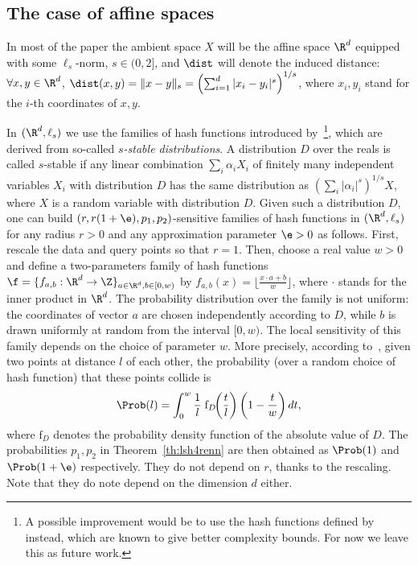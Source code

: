 \subsection{The case of affine spaces}
\label{sec:pleb_affine}

In most of the paper the ambient space $X$ will be the affine
space $\R^d$ equipped with some $\ell_s$-norm, $s\in
(0,2]$, and $\dist$ will denote the induced distance: $\forall x,y\in
\R^d$, $\dist(x,y) = \|x-y\|_s = \left(\sum_{i=1}^d
|x_i-y_i|^s\right)^{1/s}$, where $x_i,y_i$ stand for the $i$-th
coordinates of $x,y$.

In $(\R^d, \ell_s)$ we use the families of hash functions introduced
by~\citet{DIIM04}\footnote{A possible improvement would be to use the
  hash functions defined by~\citet{AI06} instead, which are known to
  give better complexity bounds. For now we leave this as future
  work.}, which are derived from so-called {\em $s$-stable
  distributions}. A distribution $D$ over the reals is called
$s$-stable if any linear combination $\sum_{i} \alpha_i X_i$ of
finitely many independent variables $X_i$ with distribution $D$ has
the same distribution as $(\sum_i |\alpha_i|^s)^{1/s} X$, where $X$ is
a random variable with distribution $D$.  Given such a distribution
$D$, one can build $(r, r(1+\e), p_1, p_2)$-sensitive families of hash
functions in $(\R^d, \ell_s)$ for any radius $r> 0$ and any
approximation parameter $\e>0$ as follows. First, rescale the data and
query points so that $r=1$. Then, choose a real value $w>0$ and define
a two-parameters family of hash functions
$\f=\{f_{a,b}:\R^d\to\Z\}_{a\in\R^d, b\in [0,w)}$ by
  $f_{a,b}(x)=\lfloor \frac{x\cdot a + b}{w}\rfloor$, where $\cdot$
  stands for the inner product in $\R^d$. The probability distribution
  over the family is not uniform: the coordinates of vector
  $a$ are chosen independently according to $D$, while $b$ is drawn
  uniformly at random from the interval $[0,w)$.  The local
    sensitivity of this family depends on the choice of parameter
    $w$. More precisely, according to~\citet{DIIM04}, given two points
    at distance $l$ of each other, the probability (over a random
    choice of hash function) that these points collide is
\begin{equation}\label{eq:proba_collision_ls}
\Prob(l)=\int_0^w \frac{1}{l}\; \mathrm{f}_D\!\! \left(\frac{t}{l}\right)
    \left(1-\frac{t}{w}\right)dt,
\end{equation}
 where $\mathrm{f}_D$ denotes the probability density function of the
 absolute value of $D$. The probabilities $p_1,p_2$ in
 Theorem~\ref{th:lsh4renn} are then obtained as $\Prob(1)$ and $\Prob(1+\e)$
 respectively. They do not depend on $r$, thanks to the
 rescaling. Note that they do note depend on the dimension $d$
 either.

